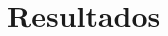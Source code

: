 \documentclass[a0,portrait]{a0poster}
\begin{document}
\begin{multicols}{2}
\begin{enumerate}
\end{enumerate}







\section*{Resultados}


\end{multicols}
\end{document}
